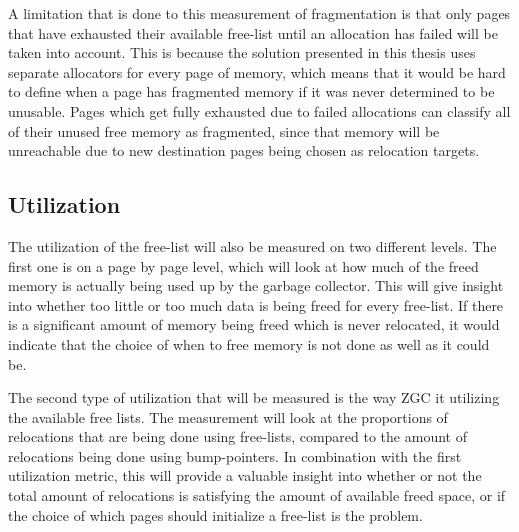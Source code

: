 A limitation that is done to this measurement of fragmentation is that only pages that have exhausted their available free-list until an allocation has failed will be taken into account. This is because the solution presented in this thesis uses separate allocators for every page of memory, which means that it would be hard to define when a page has fragmented memory if it was never determined to be unusable. Pages which get fully exhausted due to failed allocations can classify all of their unused free memory as fragmented, since that memory will be unreachable due to new destination pages being chosen as relocation targets.

\subsection{Utilization}
The utilization of the free-list will also be measured on two different levels. The first one is on a page by page level, which will look at how much of the freed memory is actually being used up by the garbage collector. This will give insight into whether too little or too much data is being freed for every free-list. If there is a significant amount of memory being freed which is never relocated, it would indicate that the choice of when to free memory is not done as well as it could be.

The second type of utilization that will be measured is the way ZGC it utilizing the available free lists. The measurement will look at the proportions of relocations that are being done using free-lists, compared to the amount of relocations being done using bump-pointers. In combination with the first utilization metric, this will provide a valuable insight into whether or not the total amount of relocations is satisfying the amount of available freed space, or if the choice of which pages should initialize a free-list is the problem. 

